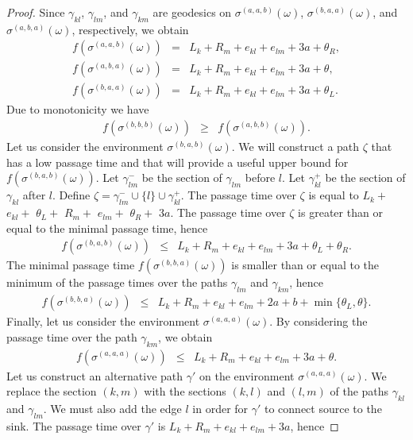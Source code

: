 \documentclass[10pt,a4paper]{amsart}
\begin{document}
\begin{proof}
 Since $\gamma_{kl}$, $\gamma_{lm}$, and $\gamma_{km}$ are geodesics on $\sigma^{(a,a,b)}(\omega)$, $\sigma^{(b,a,a)}(\omega)$, and $\sigma^{(a,b,a)}(\omega)$, respectively, we obtain 
\begin{eqnarray}
f(\sigma^{(a,a,b)}(\omega))&=&L_k+R_m+e_{kl}+e_{lm}+3a+\theta_R,\label{eqn|lbS3f01}\\
f(\sigma^{(a,b,a)}(\omega))&=&L_k+R_m+e_{kl}+e_{lm}+3a+\theta,\label{eqn|lbS3f02}\\
f(\sigma^{(b,a,a)}(\omega))&=&L_k+R_m+e_{kl}+e_{lm}+3a+\theta_L.\label{eqn|lbS3f03}
\end{eqnarray}
Due to monotonicity we have 
\begin{eqnarray}
f(\sigma^{(b,b,b)}(\omega))&\geq& f(\sigma^{(a,b,b)}(\omega)). \label{eqn|lbS3f04}
\end{eqnarray}
Let us consider the environment $\sigma^{(b,a,b)}(\omega)$. We will construct a path $\zeta$ that has a low passage time and that will provide a useful upper bound for $f(\sigma^{(b,a,b)}(\omega))$.   
Let $\gamma_{lm}^-$ be the section of $\gamma_{lm}$ before $l$. Let $\gamma_{kl}^+$ be the section of $\gamma_{kl}$ after $l$. 
Define $\zeta=\gamma_{lm}^-\cup \{l\}\cup \gamma_{kl}^+$. The passage time over $\zeta$ is equal to $L_k+$ $e_{kl}+$ $\theta_L+$ $R_m+$ $e_{lm}+$ $\theta_R+$ $3a$. 
The passage time over $\zeta$ is greater than or equal to the minimal passage time, hence
\begin{eqnarray}
f(\sigma^{(b,a,b)}(\omega))&\leq&L_k+R_m+e_{kl}+e_{lm}+3a+\theta_L+\theta_R. \label{eqn|lbS3f05}
\end{eqnarray}
The minimal passage time $f(\sigma^{(b,b,a)}(\omega))$ is smaller than or equal to the minimum 
of the passage times over the paths $\gamma_{lm}$ and $\gamma_{km}$, hence
\begin{eqnarray}
f(\sigma^{(b,b,a)}(\omega))&\leq& L_k+R_m+e_{kl} +e_{lm}+2a+b+\min\{\theta_L,\theta \}.\label{eqn|lbS3f06} 
\end{eqnarray}
Finally, let us consider the environment $\sigma^{(a,a,a)}(\omega)$. By considering the passage time over the path $\gamma_{km}$, we obtain 
\begin{eqnarray}
f(\sigma^{(a,a,a)}(\omega))&\leq& L_k+R_m+e_{kl}+e_{lm}+3a+\theta.\label{eqn|lbS3f0701}
\end{eqnarray}
Let us construct an alternative path $\gamma'$ on the environment $\sigma^{(a,a,a)}(\omega)$. We replace the section $(k,m)$ with the sections $(k,l)$ and $(l,m)$ of the paths $\gamma_{kl}$ and $\gamma_{lm}$. We must also add the edge $l$ in order for $\gamma'$ to connect source to the sink. The passage time over $\gamma'$ is $L_k+R_m+e_{kl}+e_{lm}+3a$, hence 

\end{proof}
\end{document}
